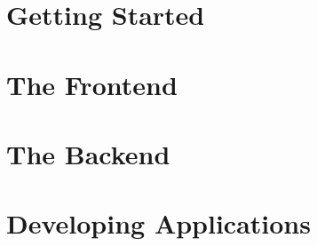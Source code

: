 \documentclass[a4paper,10pt,twoside]{book}
\begin{document}
\frontmatter




\pagestyle{plain}

\tableofcontents
\sloppy


\mainmatter


\pagestyle{headings}

\part{Getting Started}



\part{The Frontend}


\part{The Backend}


\part{Developing Applications}





\end{document}
